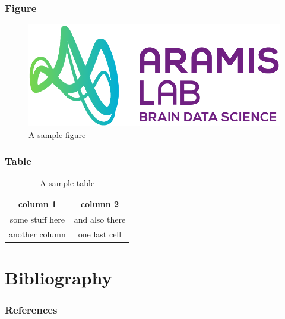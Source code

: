 \documentclass[
  11pt, %
  aspectratio=169, %
]{beamer}
\begin{document}
\begin{frame}
  \frametitle{Figure}

  \begin{figure}
    \includegraphics[height=.6\paperheight]{logos/logo_ARAMISLAB.png}
    \caption{A sample figure}
  \end{figure}

\end{frame}

\begin{frame}
  \frametitle{Table}

  \begin{table}
    \begin{tabular}{cc}
      \toprule
      column 1 & column 2\\
      \midrule
      some stuff here & and also there\\
      another column & one last cell\\
      \bottomrule
    \end{tabular}
    \caption{A sample table}
  \end{table}

\end{frame}

\section{Bibliography}

\begin{frame}
  \frametitle{References}

\end{frame}



\appendix
\end{document}
